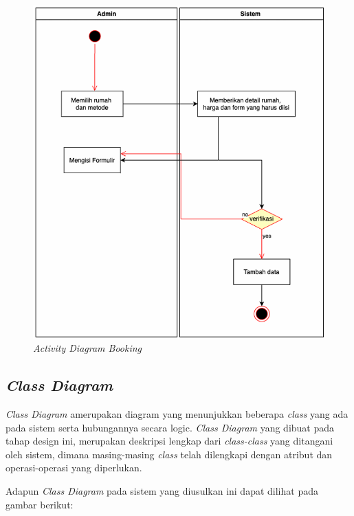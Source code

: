 \begin{enumerate}
\begin{figure}
                \includegraphics[width=0.95\linewidth]{uml/Activity Diagram - Booking.png}
                \caption{\textit{Activity Diagram Booking}}
                \label{fig:enter-label}
            \end{figure}
\end{enumerate}

\subsection{\textit{Class Diagram}}
\par \textit{Class Diagram} amerupakan diagram yang menunjukkan beberapa \textit{class} yang ada pada sistem serta hubungannya secara logic. \textit{Class Diagram} yang dibuat pada tahap design ini, merupakan deskripsi lengkap dari \textit{class-class} yang ditangani oleh sistem, dimana masing-masing \textit{class} telah dilengkapi dengan atribut dan operasi-operasi yang diperlukan.
\par Adapun \textit{Class Diagram} pada sistem yang diusulkan ini dapat dilihat pada gambar berikut:

